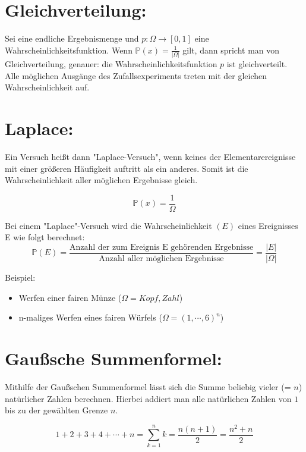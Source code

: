 \documentclass[11pt]{article}
\begin{document}
    \section{Gleichverteilung:}

    Sei \Omega eine endliche Ergebnismenge und \(p : \Omega \rightarrow [0, 1]\) eine Wahrscheinlichkeitsfunktion.
    Wenn \( \mathbb{P}(x) = \frac{1}{|\Omega|}\) gilt, dann spricht man von Gleichverteilung,
    genauer: die Wahrscheinlichkeitsfunktion \(p\) ist gleichverteilt.
    Alle möglichen Ausgänge des Zufallsexperiments treten mit der gleichen Wahrscheinlichkeit auf.


    \section{Laplace:}

    Ein Versuch heißt dann "Laplace-Versuch", wenn keines der Elementarereignisse mit einer größeren
    Häufigkeit auftritt als ein anderes. Somit ist die Wahrscheinlichkeit aller möglichen Ergebnisse gleich.

    \[\mathbb{P}(x)= \frac{1}{\Omega}\]

    Bei einem "Laplace"-Versuch wird die Wahrscheinlichkeit \((E)\) eines Ereignisses E wie folgt berechnet:
    \[\mathbb{P}(E)= \frac{\text{Anzahl der zum Ereignis E gehörenden Ergebnisse}} {\text{Anzahl aller möglichen Ergebnisse}} = \frac{|E|} {|\Omega|}\]


    Beispiel:
    \begin{itemize}
        \item Werfen einer fairen Münze (\(\Omega= {Kopf, Zahl}\))
    \end{itemize}
    \begin{itemize}
        \item n-maliges Werfen eines fairen Würfels (\(\Omega=({1,\cdots,6}) ^n\))
    \end{itemize}


    \section{Gaußsche Summenformel: }

    Mithilfe der Gaußschen Summenformel lässt sich die Summe beliebig vieler (= \(n\)) natürlicher Zahlen berechnen.
    Hierbei addiert man alle natürlichen Zahlen von \(1\) bis zu der gewählten Grenze \(n\).

    \[1 +2 +3+ 4+ \cdots +n = \sum \limits_{k=1}^{n} k = \frac{n(n+1)}{2} = \frac {n^{2}+n}{2}\]
\end{document}
